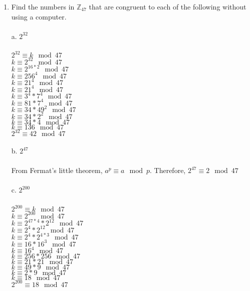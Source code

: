 \documentclass[]{article}
\begin{document}
\begin{enumerate}
    \item Find the numbers in $\mathbb{Z}_{47}$ that are congruent to each of the following without using a computer.
    \\\\a. $2^{32}$
    \\\\$2^{32} \equiv k \mod 47$
    \\$k \equiv 2^{32} \mod 47$
    \\$k \equiv 2^{16*2} \mod 47$
    \\$k \equiv 256^4 \mod 47$
    \\$k \equiv 21^4 \mod 47$
    \\$k \equiv 21^4 \mod 47$
    \\$k \equiv 3^4 * 7^4 \mod 47$
    \\$k \equiv 81 * 7^4 \mod 47$
    \\$k \equiv 34 * 49^2 \mod 47$
    \\$k \equiv 34 * 2^2 \mod 47$
    \\$k \equiv 34 * 4 \mod 47$
    \\$k \equiv 136 \mod 47$
    \\$2^{32} \equiv 42 \mod 47$
    \\\\b. $2^{47}$
    \\\\From Fermat's little theorem, $a^p \equiv a \mod p$. Therefore, $2^{47} \equiv 2 \mod 47$
    \\\\c. $2^{200}$
    \\\\$2^{200} \equiv k \mod 47$
    \\$k \equiv 2^{200} \mod 47$
    \\$k \equiv 2^{47*4}*2^{12} \mod 47$
    \\$k \equiv 2^{4}*2^{12} \mod 47$
    \\$k \equiv 2^{4}*2^{4*3} \mod 47$
    \\$k \equiv 16*16^3 \mod 47$
    \\$k \equiv 16^4 \mod 47$
    \\$k \equiv 256*256 \mod 47$
    \\$k \equiv 21*21 \mod 47$
    \\$k \equiv 49*9 \mod 47$
    \\$k \equiv 2*9 \mod 47$
    \\$k \equiv 18 \mod 47$
    \\$2^{200} \equiv 18 \mod 47$


\end{enumerate}
\end{document}
